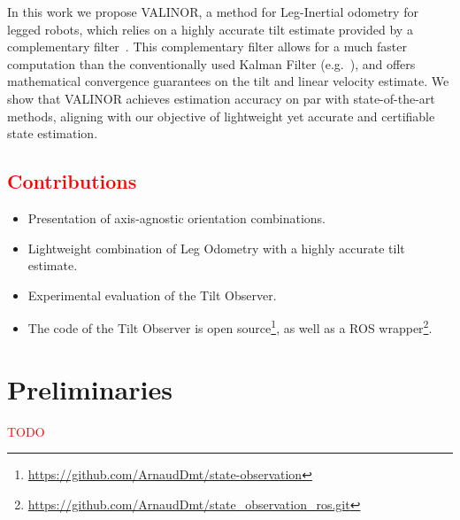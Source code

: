 \documentclass{IJCAS}
\begin{document}
In this work we propose VALINOR, a method for Leg-Inertial odometry for legged robots, which relies on a highly accurate tilt estimate provided by a complementary filter~\cite{benallegue2020LyapunovStableOrientationEstimatorHumanoids}. This complementary filter allows for a much faster computation than the conventionally used Kalman Filter (e.g.~\cite{Hartley2020RIEKF}), and offers mathematical convergence guarantees on the tilt and linear velocity estimate. We show that VALINOR achieves estimation accuracy on par with state-of-the-art methods, aligning with our objective of lightweight yet accurate and certifiable state estimation.


\subsection{\textcolor{red}{Contributions}}
\begin{itemize}
  \item Presentation of axis-agnostic orientation combinations.
  \item Lightweight combination of Leg Odometry with a highly accurate tilt estimate.
  \item Experimental evaluation of the Tilt Observer.
  \item The code of the Tilt Observer is open source\footnote{\footnotesize \url{https://github.com/ArnaudDmt/state-observation}}, as well as a ROS wrapper\footnote{\footnotesize \url{https://github.com/ArnaudDmt/state_observation_ros.git}}.
\end{itemize}

\section{Preliminaries}
\textcolor{red}{TODO}
\end{document}
